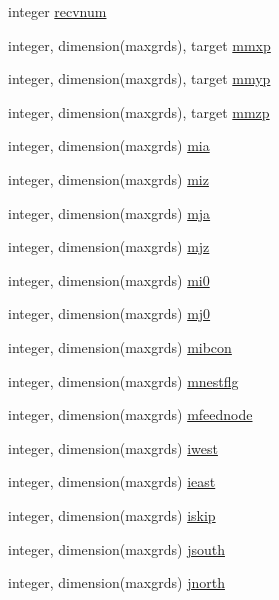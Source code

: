 \begin{DoxyCompactItemize}
integer \hyperlink{namespaceed__node__coms_ae516cc09ceda6c63673e5972aa6a6963}{recvnum}
\item 
integer, dimension(maxgrds), target \hyperlink{namespaceed__node__coms_a0a26786e048c93181d52c25d73142af6}{mmxp}
\item 
integer, dimension(maxgrds), target \hyperlink{namespaceed__node__coms_a79783fa824eaca254de5ceb5273f1ff2}{mmyp}
\item 
integer, dimension(maxgrds), target \hyperlink{namespaceed__node__coms_a9384e8659a53635a2fbec99d3b3ca02f}{mmzp}
\item 
integer, dimension(maxgrds) \hyperlink{namespaceed__node__coms_aa872e042de37a4d54f239c536576fa3a}{mia}
\item 
integer, dimension(maxgrds) \hyperlink{namespaceed__node__coms_a84a2e967ef52e0e39e711d4eef30683e}{miz}
\item 
integer, dimension(maxgrds) \hyperlink{namespaceed__node__coms_a7c23d30331ab985adf33e7e0abaca9d7}{mja}
\item 
integer, dimension(maxgrds) \hyperlink{namespaceed__node__coms_aa271449af5bbb67875d63c1c3a974905}{mjz}
\item 
integer, dimension(maxgrds) \hyperlink{namespaceed__node__coms_ac0ed536bf855d993b1468e7313b63c56}{mi0}
\item 
integer, dimension(maxgrds) \hyperlink{namespaceed__node__coms_ad774b942f26ad9d0946e2b3be5e69851}{mj0}
\item 
integer, dimension(maxgrds) \hyperlink{namespaceed__node__coms_af8cf428b242766c5d3114bd5053ce26d}{mibcon}
\item 
integer, dimension(maxgrds) \hyperlink{namespaceed__node__coms_a9c6d2d73db66ee337e0d7a9b213b05d2}{mnestflg}
\item 
integer, dimension(maxgrds) \hyperlink{namespaceed__node__coms_a5de467657a345cda5f1b8bdd83cb8cb4}{mfeednode}
\item 
integer, dimension(maxgrds) \hyperlink{namespaceed__node__coms_a799bc57708f0eade1e7c33bfed33deea}{iwest}
\item 
integer, dimension(maxgrds) \hyperlink{namespaceed__node__coms_a6aa981e6ec7f7d2b2aea7f3b372fadc9}{ieast}
\item 
integer, dimension(maxgrds) \hyperlink{namespaceed__node__coms_aa0b58de3ae40a5b1f807eeb1183579f9}{iskip}
\item 
integer, dimension(maxgrds) \hyperlink{namespaceed__node__coms_a1c7e45eb29343f70f7789155ffb43673}{jsouth}
\item 
integer, dimension(maxgrds) \hyperlink{namespaceed__node__coms_afd254e42e760f8e20809b89c6862f940}{jnorth}

\end{DoxyCompactItemize}
